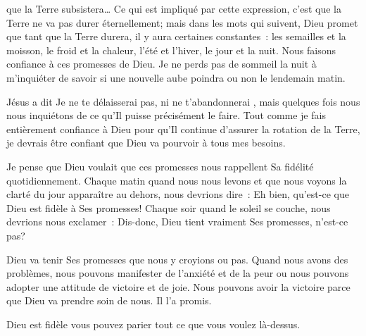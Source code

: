  que la Terre subsistera\dots{} \fg{} Ce qui est
 impliqué par cette expression, c'est que la Terre ne va pas durer éternellement;
 mais dans les mots qui suivent, Dieu promet que tant que la Terre durera, il y
 aura certaines constantes~: les semailles et la moisson, le froid et la chaleur,
 l'été et l'hiver, le jour et la nuit. Nous faisons confiance à ces promesses de
 Dieu. Je ne perds pas de sommeil la nuit à m'inquiéter de savoir si une nouvelle
 aube poindra ou non le lendemain matin. 


Jésus a dit \og Je ne te délaisserai pas, ni ne t'abandonnerai \fg{}, mais
 quelques fois nous nous inquiétons de ce qu'Il puisse précisément le faire.
 Tout comme je fais entièrement confiance à Dieu pour qu'Il continue d'assurer
 la rotation de la Terre, je devrais être confiant que Dieu va pourvoir à tous
 mes besoins.

Je pense que Dieu voulait que ces promesses nous rappellent Sa fidélité
 quotidiennement. Chaque matin quand nous nous levons et que nous voyons la
 clarté du jour apparaître au dehors, nous devrions dire~: \og Eh bien, qu'est-ce
 que Dieu est fidèle à Ses promesses! \fg{} Chaque soir quand le soleil se
 couche, nous devrions nous exclamer~: \og Dis-donc, Dieu tient vraiment Ses
 promesses, n'est-ce pas? \fg{}

Dieu va tenir Ses promesses que nous y croyions ou pas. Quand nous avons des
 problèmes, nous pouvons manifester de l'anxiété et de la peur ou nous pouvons
 adopter une attitude de victoire et de joie. Nous pouvons avoir la victoire
 parce que Dieu va prendre soin de nous. Il l'a promis.

Dieu est fidèle \ocadr{}vous pouvez parier tout ce que vous voulez là-dessus. 

\dvrule







